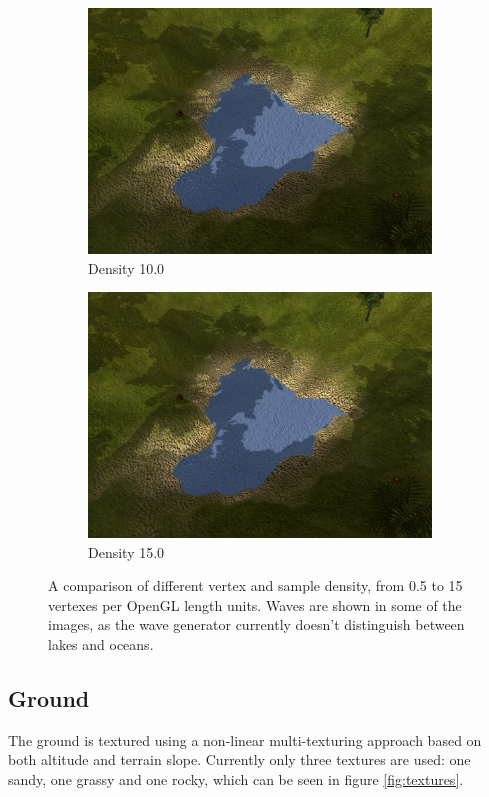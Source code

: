\begin{figure}[H]
\begin{subfigure}{.5\textwidth}
  \centering
  \includegraphics[width=0.9\linewidth]{images/terrainDensityComparison1_10.jpg}
  \caption{Density 10.0}
  \label{fig:textureDensity10}
\end{subfigure}%
\begin{subfigure}{.5\textwidth}
  \centering
  \includegraphics[width=0.9\linewidth]{images/terrainDensityComparison1_15.jpg}
  \caption{Density 15.0}
  \label{fig:textureDensity15}
\end{subfigure}%
  \caption{A comparison of different vertex and sample density, from 0.5 to 15 vertexes per OpenGL length units. Waves are shown in some of the images, as the wave generator currently doesn't distinguish between lakes and oceans.}
  \label{fig:textureDensityComparison1}
\end{figure}

\newpage
\subsection{Ground}
The ground is textured using a non-linear multi-texturing approach based on both altitude and terrain slope. Currently only three textures are used: one sandy, one grassy and one rocky, which can be seen in figure \ref{fig:textures}.


